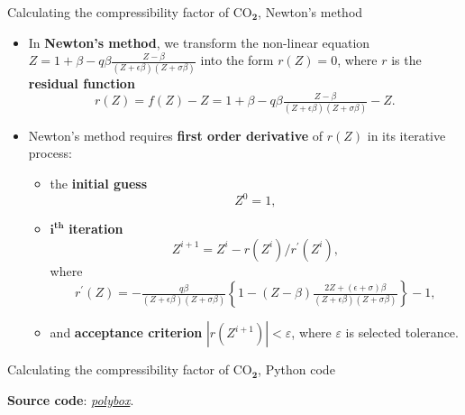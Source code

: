 %
%
\begin{frame}{Calculating the compressibility factor of CO$_{\boldsymbol{2}}$, Newton's method}
\begin{itemize}
\item In \alert{\textbf{Newton's method}}, we transform the non-linear equation
$Z=1+\beta-q\beta\tfrac{Z-\beta}{(Z+\epsilon\beta)(Z+\sigma\beta)}$
into the form $r(Z)=0$, where $r$ is the \textbf{residual function} 
\[
\boxed{r(Z) 
	= f(Z) - Z 
	= 1+\beta-q\beta\tfrac{Z-\beta}{(Z+\epsilon\beta)(Z+\sigma\beta)}-Z}.
\]
\item Newton's method requires \textbf{first order derivative} of $r(Z)$ in its iterative process:
\begin{itemize}
\item the \textbf{initial guess} 
\[
Z^{0}=1,
\]
\item $\boldsymbol{i^{\text{th}}}$ \textbf{iteration}
\[
Z^{i+1} =Z^{i}-r(Z^{i})/r^{\prime}(Z^{i}),
\]
where 
%
\[
r^{\prime}(Z)=-\tfrac{q\beta}{(Z+\epsilon\beta)(Z+\sigma\beta)}\left\{ 1-(Z-\beta)\tfrac{2Z+(\epsilon+\sigma)\beta}{(Z+\epsilon\beta)(Z+\sigma\beta)}\right\} -1,
\]
%
\item and \textbf{acceptance criterion} $|r(Z^{i+1})|<\varepsilon$, where $\varepsilon$ is selected tolerance.
\end{itemize} 
\end{itemize}
\end{frame}
%
%
\begin{frame}{Calculating the compressibility factor of CO$_{\boldsymbol{2}}$, Python code}



\textbf{Source code}: \href{}{\textcolor{indigo(dye)}{\it polybox}}.

\end{frame}
